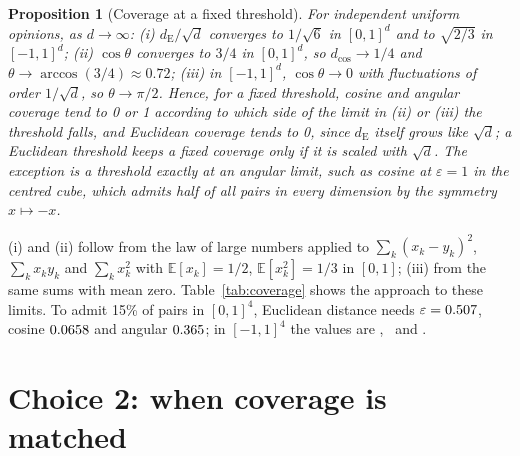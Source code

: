 \documentclass[11pt]{article}
\newtheorem{proposition}{Proposition}
\begin{document}
\begin{proposition}[Coverage at a fixed threshold]
\label{prop:concentration}
For independent uniform opinions, as $d \to \infty$:
(i) $d_{\mathrm{E}}/\sqrt{d}$ converges to $1/\sqrt6$ in $[0,1]^d$ and to $\sqrt{2/3}$ in $[-1,1]^d$;
(ii) $\cos\theta$ converges to $3/4$ in $[0,1]^d$, so $d_{\cos} \to 1/4$ and $\theta \to \arccos(3/4) \approx 0.72$;
(iii) in $[-1,1]^d$, $\cos\theta \to 0$ with fluctuations of order $1/\sqrt d$, so $\theta \to \pi/2$.
Hence, for a fixed threshold, cosine and angular coverage tend to 0 or 1 according to which side of the limit in (ii) or (iii) the threshold falls, and Euclidean coverage tends to 0, since $d_{\mathrm{E}}$ itself grows like $\sqrt d$; a Euclidean threshold keeps a fixed coverage only if it is scaled with $\sqrt d$.
The exception is a threshold exactly at an angular limit, such as cosine at $\varepsilon = 1$ in the centred cube, which admits half of all pairs in every dimension by the symmetry $x \mapsto -x$.
\end{proposition}
\noindent (i) and (ii) follow from the law of large numbers applied to $\sum_k (x_k - y_k)^2$, $\sum_k x_k y_k$ and $\sum_k x_k^2$ with $\mathbb{E}[x_k]=1/2$, $\mathbb{E}[x_k^2]=1/3$ in $[0,1]$; (iii) from the same sums with mean zero.
Table~\ref{tab:coverage} shows the approach to these limits.
To admit 15\% of pairs in $[0,1]^4$, Euclidean distance needs $\varepsilon = 0.507$, cosine $0.0658$ and angular $0.365$; in $[-1,1]^4$ the values are \MatchCentredEuc, \MatchCentredCos\ and \MatchCentredAng.

\section{Choice 2: when coverage is matched}
\label{sec:matching}
\end{document}
